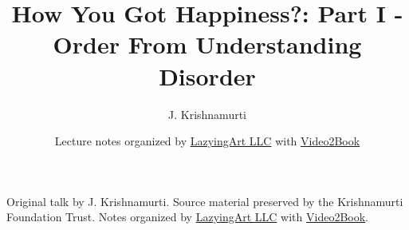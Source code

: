 \documentclass[11pt,oneside]{book}
\begin{document}
\frontmatter
\title{How You Got Happiness?: Part I - Order From Understanding Disorder}
\author{J. Krishnamurti}
\date{Lecture notes organized by \href{https://lazying.art}{LazyingArt LLC} with \href{https://github.com/lachlanchen/Video2Book}{Video2Book}}
\maketitle
\begin{center}
\small Original talk by J. Krishnamurti. Source material preserved by the Krishnamurti Foundation Trust. Notes organized by \href{https://lazying.art}{LazyingArt LLC} with \href{https://github.com/lachlanchen/Video2Book}{Video2Book}.
\end{center}
\clearpage
\mainmatter

\end{document}
